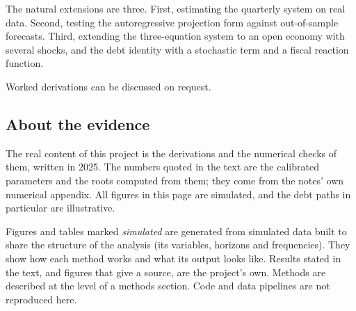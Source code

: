 \documentclass[
  british,
  a4paper,
]{article}
\begin{document}
The natural extensions are three. First, estimating the quarterly system
on real data. Second, testing the autoregressive projection form against
out-of-sample forecasts. Third, extending the three-equation system to
an open economy with several shocks, and the debt identity with a
stochastic term and a fiscal reaction function.

Worked derivations can be discussed on request.

\subsection{About the evidence}\label{about-the-evidence}

The real content of this project is the derivations and the numerical
checks of them, written in 2025. The numbers quoted in the text are the
calibrated parameters and the roots computed from them; they come from
the notes' own numerical appendix. All figures in this page are
simulated, and the debt paths in particular are illustrative.

Figures and tables marked \emph{simulated} are generated from simulated
data built to share the structure of the analysis (its variables,
horizons and frequencies). They show how each method works and what its
output looks like. Results stated in the text, and figures that give a
source, are the project's own. Methods are described at the level of a
methods section. Code and data pipelines are not reproduced here.
\end{document}
